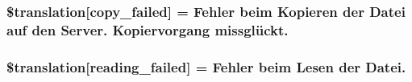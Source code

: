 \subsubsection[{\$translation}]{\setlength{\rightskip}{0pt plus 5cm}\$translation\mbox{[}\textquotesingle{}copy\+\_\+failed\textquotesingle{}\mbox{]} = \textquotesingle{}Fehler beim Kopieren der Datei auf den Server. Kopiervorgang missglückt.\textquotesingle{}}\label{class_8upload_8de___d_e_8php_a783c9358bcf54a054545b50098bc679b}
\hypertarget{class_8upload_8de___d_e_8php_a01bea14c9fd5f353f62db44beabfcd42}{}
\subsubsection[{\$translation}]{\setlength{\rightskip}{0pt plus 5cm}\$translation\mbox{[}\textquotesingle{}reading\+\_\+failed\textquotesingle{}\mbox{]} = \textquotesingle{}Fehler beim Lesen der Datei.\textquotesingle{}}\label{class_8upload_8de___d_e_8php_a01bea14c9fd5f353f62db44beabfcd42}
